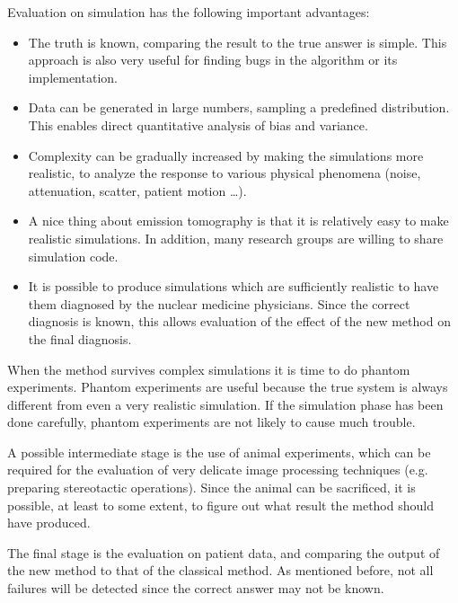Evaluation on simulation has the following important advantages:
\begin{itemize}
  \item The truth is known, comparing the result to the true answer is simple.
        This approach is also very useful for finding bugs in the algorithm or
        its implementation.
  \item Data can be generated in large numbers, sampling a predefined
        distribution. This enables direct quantitative analysis of bias and
        variance.
  \item Complexity can be gradually increased by making the simulations more
        realistic, to analyze the response to various physical phenomena
        (noise, attenuation, scatter, patient motion \ldots).
  \item A nice thing about emission tomography is that it is relatively easy
        to make realistic simulations. In addition, many research groups are
        willing to share simulation code.
  \item It is possible to produce simulations which are sufficiently realistic
        to have them diagnosed by the nuclear medicine physicians. Since the
        correct diagnosis is known, this allows evaluation of the effect of
        the new method on the final diagnosis.
\end{itemize}

When the method survives complex simulations it is time to do phantom
experiments. Phantom experiments are useful because the true system is always
different from even a very realistic simulation. If the simulation phase has
been done carefully, phantom experiments are not likely to cause much trouble.

A possible intermediate stage is the use of animal experiments, which can be
required for the evaluation of very delicate image processing techniques
(e.g. preparing stereotactic operations). Since the animal can be sacrificed,
it is possible, at least to some extent, to figure out what result the method
should have produced.

The final stage is the evaluation on patient data, and comparing the output of
the new method to that of the classical method. As mentioned before, not all
failures will be detected since the correct answer may not be known.